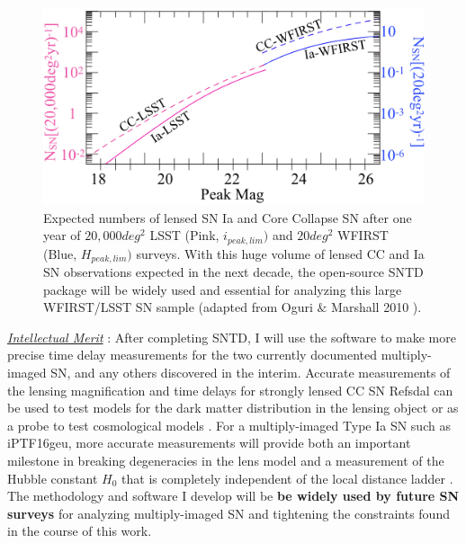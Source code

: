 \begin{figure}
\centering
\includegraphics[width=.5\textwidth]{FIG/wfirst_lsst2}
\caption{
\noindent\fontsize{10}{14}\selectfont
Expected numbers of lensed SN Ia and Core Collapse SN after one year
of $20,000deg^2$ LSST (Pink, $i_{peak,lim})$ and $20deg^2$ WFIRST
(Blue, $H_{peak,lim})$ surveys. With this huge volume of lensed CC and
Ia SN observations expected in the next decade, the open-source SNTD
package will be widely used and essential for analyzing this large
WFIRST/LSST SN sample (adapted from Oguri $\&$ Marshall
2010 ).}
\end{figure}
\noindent\underline{\textit{Intellectual Merit}} : After completing SNTD, I
will use the software to make more precise time delay measurements for
the two currently documented multiply-imaged SN, and any others
discovered in the interim. Accurate measurements of the lensing
magnification and time delays for strongly lensed CC SN Refsdal can be
used to test models for the dark matter distribution in the lensing
object  or as a probe to test
cosmological models \cite{Suyu:2014}. For a multiply-imaged Type Ia
SN such as iPTF16geu, more accurate measurements will provide both an
important milestone in breaking degeneracies in the lens model and a
measurement of the Hubble constant $H_0$ that is completely
independent of the local distance
ladder . The methodology and software I
develop will be \textbf{be widely used by future SN surveys} for
analyzing multiply-imaged SN and tightening the constraints found in
the course of this work.

